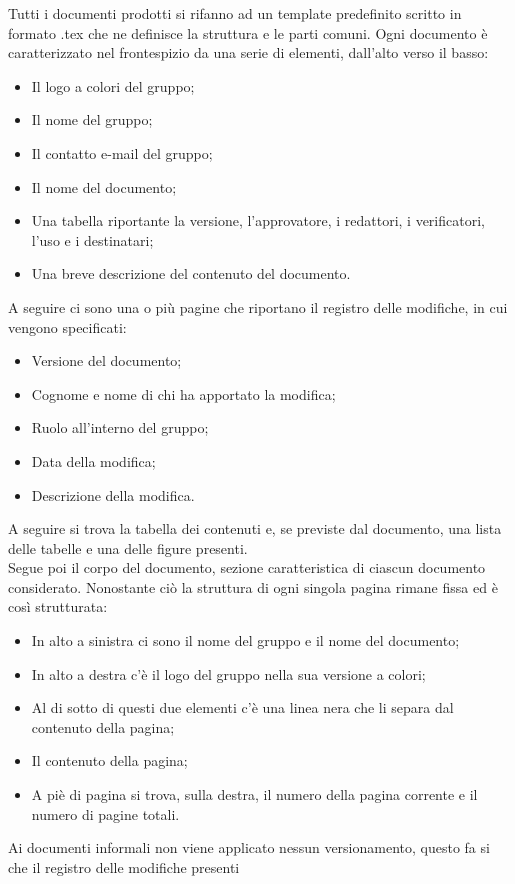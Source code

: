 Tutti i documenti prodotti si rifanno ad un template predefinito scritto in formato .tex che ne definisce la struttura 
e le parti comuni. Ogni documento è caratterizzato nel frontespizio da una serie di elementi, dall'alto verso il basso:
\begin{itemize}
    \item Il logo a colori del gruppo;
    \item Il nome del gruppo;
    \item Il contatto e-mail del gruppo;
    \item Il nome del documento;
    \item Una tabella riportante la versione, l'approvatore, i redattori, i verificatori, l'uso e i destinatari;
    \item Una breve descrizione del contenuto del documento.
\end{itemize}
A seguire ci sono una o più pagine che riportano il registro delle modifiche, in cui vengono specificati:
\begin{itemize}
    \item Versione del documento;
    \item Cognome e nome di chi ha apportato la modifica;
    \item Ruolo all'interno del gruppo;
    \item Data della modifica;
    \item Descrizione della modifica.
\end{itemize}
A seguire si trova la tabella dei contenuti e, se previste dal documento, una lista delle tabelle e una delle figure presenti.\\
Segue poi il corpo del documento, sezione caratteristica di ciascun documento considerato. Nonostante ciò la struttura 
di ogni singola pagina rimane fissa ed è così strutturata:
\begin{itemize}
    \item In alto a sinistra ci sono il nome del gruppo e il nome del documento;
    \item In alto a destra c'è il logo del gruppo nella sua versione a colori;
    \item Al di sotto di questi due elementi c'è una linea nera che li separa dal contenuto della pagina;
    \item Il contenuto della pagina;
    \item A piè di pagina si trova, sulla destra, il numero della pagina corrente e il numero di pagine totali.
\end{itemize}
Ai documenti informali non viene applicato nessun versionamento, questo fa si che il registro delle modifiche presenti 
